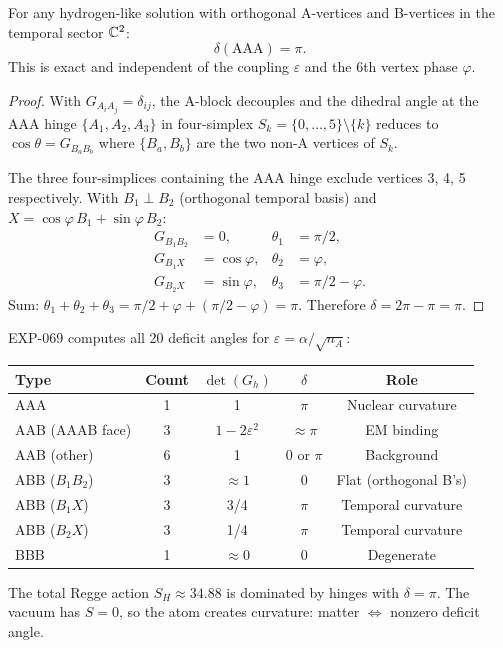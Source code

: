 \begin{theorem}
\label{thm:delta_AAA}
For any hydrogen-like solution with orthogonal A-vertices and B-vertices in the temporal sector $\mathbb{C}^2$:
\begin{equation}
\boxed{\delta(\mathrm{AAA}) = \pi.}
\end{equation}
This is exact and independent of the coupling $\varepsilon$ and the 6th vertex phase $\varphi$.
\end{theorem}
\begin{proof}
With $G_{A_i A_j} = \delta_{ij}$, the A-block decouples and the dihedral angle at the AAA hinge $\{A_1,A_2,A_3\}$ in four-simplex $S_k = \{0,\ldots,5\}\setminus\{k\}$ reduces to $\cos\theta = G_{B_a B_b}$ where $\{B_a,B_b\}$ are the two non-A vertices of $S_k$.

The three four-simplices containing the AAA hinge exclude vertices 3, 4, 5 respectively.  With $B_1 \perp B_2$ (orthogonal temporal basis) and $X = \cos\varphi\,B_1 + \sin\varphi\,B_2$:
\begin{align}
G_{B_1 B_2} &= 0, & \theta_1 &= \pi/2, \\
G_{B_1 X} &= \cos\varphi, & \theta_2 &= \varphi, \\
G_{B_2 X} &= \sin\varphi, & \theta_3 &= \pi/2 - \varphi.
\end{align}
Sum: $\theta_1 + \theta_2 + \theta_3 = \pi/2 + \varphi + (\pi/2 - \varphi) = \pi$.  Therefore $\delta = 2\pi - \pi = \pi$.
\end{proof}

\begin{remark}
EXP-069 computes all 20 deficit angles for $\varepsilon = \alpha/\sqrt{n_A}$:
\begin{center}
\begin{tabular}{lcccc}
\hline
Type & Count & $\det(G_h)$ & $\delta$ & Role \\
\hline
AAA & 1 & 1 & $\pi$ & Nuclear curvature \\
AAB (AAAB face) & 3 & $1-2\varepsilon^2$ & $\approx \pi$ & EM binding \\
AAB (other) & 6 & 1 & $0$ or $\pi$ & Background \\
ABB ($B_1 B_2$) & 3 & $\approx 1$ & $0$ & Flat (orthogonal B's) \\
ABB ($B_1 X$) & 3 & 3/4 & $\pi$ & Temporal curvature \\
ABB ($B_2 X$) & 3 & 1/4 & $\pi$ & Temporal curvature \\
BBB & 1 & $\approx 0$ & 0 & Degenerate \\
\hline
\end{tabular}
\end{center}
The total Regge action $S_H \approx 34.88$ is dominated by hinges with $\delta = \pi$.  The vacuum has $S = 0$, so the atom creates curvature: matter $\Leftrightarrow$ nonzero deficit angle.
\end{remark}

